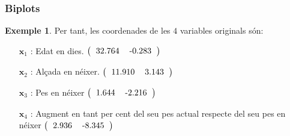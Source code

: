 \documentclass[12pt,t]{beamer}
\theoremstyle{plain}
\theoremstyle{definition}
\newtheorem{exemple}{Exemple}
\begin{document}
\begin{frame}
\frametitle{Biplots}
\begin{exemple}
Per tant, les coordenades de les $4$ variables originals són:
\begin{itemize}
\item[${\mathbf{x}_1}$]: Edat en dies. $\left(
\begin{tabular}{rr}
  32.764 & -0.283 \\ 
  \end{tabular}\right)
$

\item[${\mathbf{x}_2}$]: Alçada en néixer. $\left(
\begin{tabular}{rr}
  11.910 & 3.143 \\ 
  \end{tabular}\right)
$

\item[${\mathbf{x}_3}$]: Pes en néixer $\left(
\begin{tabular}{rr}
  1.644 & -2.216 \\ 
  \end{tabular}\right)
$

\item[${\mathbf{x}_4}$]: Augment en tant per cent del seu pes actual respecte del seu pes en néixer $\left(
\begin{tabular}{rr}
  2.936 & -8.345 \\ 
  \end{tabular}\right)
$
\end{itemize}
\end{exemple}
\end{frame}
\end{document}
